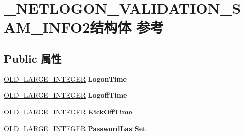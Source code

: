 \hypertarget{struct___n_e_t_l_o_g_o_n___v_a_l_i_d_a_t_i_o_n___s_a_m___i_n_f_o2}{}\section{\+\_\+\+N\+E\+T\+L\+O\+G\+O\+N\+\_\+\+V\+A\+L\+I\+D\+A\+T\+I\+O\+N\+\_\+\+S\+A\+M\+\_\+\+I\+N\+F\+O2结构体 参考}
\label{struct___n_e_t_l_o_g_o_n___v_a_l_i_d_a_t_i_o_n___s_a_m___i_n_f_o2}
\subsection*{Public 属性}
\begin{DoxyCompactItemize}
\item 
\mbox{\label{struct___n_e_t_l_o_g_o_n___v_a_l_i_d_a_t_i_o_n___s_a_m___i_n_f_o2_ae99aec43c5767c2191bb760a629b5eab}} 
\hyperlink{struct___o_l_d___l_a_r_g_e___i_n_t_e_g_e_r}{O\+L\+D\+\_\+\+L\+A\+R\+G\+E\+\_\+\+I\+N\+T\+E\+G\+ER} {\bfseries Logon\+Time}
\item 
\mbox{\label{struct___n_e_t_l_o_g_o_n___v_a_l_i_d_a_t_i_o_n___s_a_m___i_n_f_o2_aa6d11f9467bdad61cb981389cc596116}} 
\hyperlink{struct___o_l_d___l_a_r_g_e___i_n_t_e_g_e_r}{O\+L\+D\+\_\+\+L\+A\+R\+G\+E\+\_\+\+I\+N\+T\+E\+G\+ER} {\bfseries Logoff\+Time}
\item 
\mbox{\label{struct___n_e_t_l_o_g_o_n___v_a_l_i_d_a_t_i_o_n___s_a_m___i_n_f_o2_a66374c4ef811e1a838af89f97243a7be}} 
\hyperlink{struct___o_l_d___l_a_r_g_e___i_n_t_e_g_e_r}{O\+L\+D\+\_\+\+L\+A\+R\+G\+E\+\_\+\+I\+N\+T\+E\+G\+ER} {\bfseries Kick\+Off\+Time}
\item 
\mbox{\label{struct___n_e_t_l_o_g_o_n___v_a_l_i_d_a_t_i_o_n___s_a_m___i_n_f_o2_a6c7d71a3fad25189e990234229e7a145}} 
\hyperlink{struct___o_l_d___l_a_r_g_e___i_n_t_e_g_e_r}{O\+L\+D\+\_\+\+L\+A\+R\+G\+E\+\_\+\+I\+N\+T\+E\+G\+ER} {\bfseries Password\+Last\+Set}
\item 

\end{DoxyCompactItemize}
